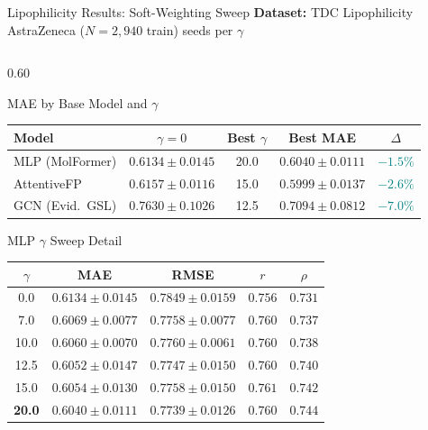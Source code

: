 \documentclass[aspectratio=169]{beamer}
\begin{document}
\begin{frame}[t,shrink=15]{Lipophilicity Results: Soft-Weighting Sweep}
\textbf{Dataset:} TDC Lipophilicity AstraZeneca ($N{=}2{,}940$ train)  seeds per $\gamma$
\vspace{2pt}
\begin{columns}[T]
\begin{column}{0.60\textwidth}
\begin{block}{MAE by Base Model and $\gamma$}
\centering\footnotesize
\renewcommand{\arraystretch}{0.85}
\setlength{\tabcolsep}{3pt}
\begin{tabular}{lcccc}
\toprule
\textbf{Model} & $\gamma{=}0$ & Best $\gamma$ & \textbf{Best MAE} & $\Delta$ \\
\midrule
MLP (MolFormer) & $0.6134{\pm}0.0145$ & 20.0 & $\mathbf{0.6040{\pm}0.0111}$ & \textcolor{teal}{$-1.5\%$} \\
AttentiveFP     & $0.6157{\pm}0.0116$ & 15.0 & $\mathbf{0.5999{\pm}0.0137}$ & \textcolor{teal}{$-2.6\%$} \\
GCN (Evid.~GSL) & $0.7630{\pm}0.1026$ & 12.5 & $0.7094{\pm}0.0812$ & \textcolor{teal}{$-7.0\%$} \\
\bottomrule
\end{tabular}
\end{block}
\begin{block}{MLP $\gamma$ Sweep Detail}
\centering\scriptsize
\renewcommand{\arraystretch}{0.85}
\setlength{\tabcolsep}{3pt}
\begin{tabular}{ccccc}
\toprule
$\gamma$ & MAE & RMSE & $r$ & $\rho$ \\
\midrule
0.0  & $0.6134{\pm}0.0145$ & $0.7849{\pm}0.0159$ & $0.756$ & $0.731$ \\
7.0  & $0.6069{\pm}0.0077$ & $0.7758{\pm}0.0077$ & $0.760$ & $0.737$ \\
10.0 & $0.6060{\pm}0.0070$ & $0.7760{\pm}0.0061$ & $0.760$ & $0.738$ \\
12.5 & $0.6052{\pm}0.0147$ & $0.7747{\pm}0.0150$ & $0.760$ & $0.740$ \\
15.0 & $0.6054{\pm}0.0130$ & $0.7758{\pm}0.0150$ & $0.761$ & $0.742$ \\
\textbf{20.0} & $\mathbf{0.6040{\pm}0.0111}$ & $\mathbf{0.7739{\pm}0.0126}$ & $\mathbf{0.760}$ & $\mathbf{0.744}$ \\
\bottomrule
\end{tabular}
\end{block}

\end{column}
\end{columns}
\end{frame}
\end{document}

